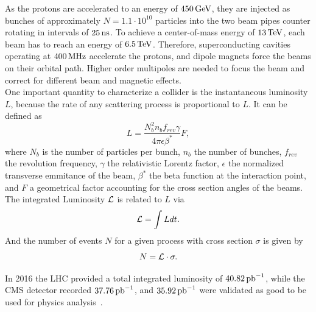 As the protons are accelerated to an energy of $450\,\text{Ge\hspace{-.08em}V}$, they are injected as bunches of approximately $N=1.1\cdot10^{10}$ particles into the two beam pipes counter rotating in intervals of $25\,\text{ns}$. To achieve a center-of-mass energy of $13\,\text{Te\hspace{-.08em}V}$, each beam has to reach an energy of $6.5\,\text{Te\hspace{-.08em}V}$. Therefore, superconducting cavities operating at $400\,\text{MHz}$ accelerate the protons, and dipole magnets force the beams on their orbital path. Higher order multipoles are needed to focus the beam and correct for different beam and magnetic effects.\\
One important quantity to characterize a collider is the instantaneous luminosity $L$, because the rate of any scattering process is proportional to $L$. It can be defined as
\begin{equation}
 L = \frac{N_{b}^2 n_{b} f_{rev} \gamma} {4\pi \epsilon \beta^{*}}F,
\end{equation}
where $N_b$ is the number of particles per bunch, $n_b$ the number of bunches, $f_{rev}$ the revolution frequency, $\gamma$ the relativistic Lorentz factor, $\epsilon$ the normalized transverse emmitance of the beam, $\beta^{*}$ the beta function at the interaction point, and $F$ a geometrical factor accounting for the cross section angles of the beams. The integrated Luminosity $\mathcal{L}$ is related to $L$ via
\begin{equation}
 \mathcal{L}= \int L dt.
\end{equation}
And the number of events $N$ for a given process with cross section $\sigma$ is given by
\begin{equation}
 N= \mathcal{L} \cdot \sigma.
\end{equation}

In 2016 the LHC provided a total integrated luminosity of $40.82\mbox{\ensuremath{\,\text{pb}^\text{$-$1}}}$, while the CMS detector recorded $37.76\mbox{\ensuremath{\,\text{pb}^\text{$-$1}}}$, and $35.92\mbox{\ensuremath{\,\text{pb}^\text{$-$1}}}$ were validated as good to be used for physics analysis~\cite{DataQuality}.





